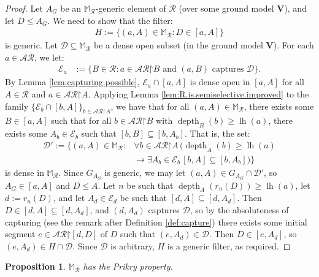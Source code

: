 \documentclass[10pt,a4paper]{amsart}
\theoremstyle{plain}
\numberwithin{equation}{section}
\newtheorem{proposition}[theorem]{Proposition}
\theoremstyle{definition}
\newcommand{\func}{\operatorname}
\newcommand{\cal}{\mathcal}
\renewcommand{\bf}{\mathbf}
\newcommand{\restrictedto}{\mathord{\upharpoonright}}
\newcommand{\V}{\bf{V}}
\newcommand{\lh}{\func{lh}}
\newcommand{\depth}{\func{depth}}
\newcommand{\D}{\cal{D}}
\newcommand{\E}{\cal{E}}
\begin{document}
\begin{proof}
    Let $A_G$ be an $\mathbb{M}_\cal{R}$-generic element of $\cal{R}$ (over some ground model $\V$), and let $D \leq A_G$. We need to show that the filter:
    \begin{align*}
        H := \{(a,A) \in \mathbb{M}_\cal{R} : D \in [a,A]\}
    \end{align*}
    is generic. Let $\D \subseteq \mathbb{M}_\cal{R}$ be a dense open subset (in the ground model $\V$). For each $a \in \cal{AR}$, we let:
    \begin{align*}
        \E_a &:= \{B \in \cal{R} : a \in \cal{AR}\restrictedto B \text{ and $(a,B)$ captures $\D$}\}.
    \end{align*}
    By Lemma \ref{lem:capturing.possible}, $\E_a \cap [a,A]$ is dense open in $[a,A]$ for all $A \in \cal{R}$ and $a \in \cal{AR}\restrictedto A$. Applying Lemma \ref{lem:R.is.semiselective.improved} to the family $\{\E_b \cap [b,A]\}_{b \in \cal{AR}\restrictedto A}$, we have that for all $(a,A) \in \mathbb{M}_\cal{R}$, there exists some $B \in [a,A]$ such that for all $b \in \cal{AR}\restrictedto B$ with $\depth_B(b) \geq \lh(a)$, there exists some $A_b \in \E_b$ such that $[b,B] \subseteq [b,A_b]$. That is, the set:
    \begin{align*}
        \D' := \{(a,A) \in \mathbb{M}_\cal{R} : {}&\forall b \in \cal{AR}\restrictedto A \, (\depth_A(b) \geq \lh(a) \\
        &\to \exists A_b \in \E_b \, [b,A] \subseteq [b,A_b])\}
    \end{align*}
    is dense in $\mathbb{M}_\cal{R}$. Since $G_{A_G}$ is generic, we may let $(a,A) \in G_{A_G} \cap \D'$, so $A_G \in [a,A]$ and $D \leq A$. Let $n$ be such that $\depth_A(r_n(D)) \geq \lh(a)$, let $d := r_n(D)$, and let $A_d \in \E_d$ be such that $[d,A] \subseteq [d,A_d]$. Then $D \in [d,A] \subseteq [d,A_d]$, and $(d,A_d)$ captures $\D$, so by the absoluteness of capturing (see the remark after Definition \ref{def:capture}) there exists some initial segment $e \in \cal{AR}\restrictedto[d,D]$ of $D$ such that $(e,A_d) \in \D$. Then $D \in [e,A_d]$, so $(e,A_d) \in H \cap \D$. Since $\D$ is arbitrary, $H$ is a generic filter, as required.
\end{proof}


\begin{proposition}
\label{prop:semiselective.implies.Prikry}
    $\mathbb{M}_\cal{R}$ has the Prikry property.
\end{proposition}
\end{document}
